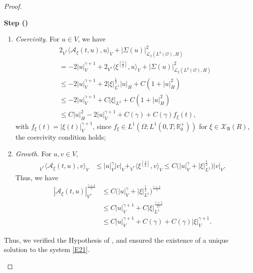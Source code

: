 \documentclass[english,a4paper,11pt]{amsart}
\theoremstyle{plain}
\theoremstyle{definition}
\theoremstyle{remark}
\renewcommand{\emph}[1]{{\sl #1}}
\numberwithin{equation}{section}
\newcounter{lil1}
\newenvironment{step}
{\begin{list} { \bf Step (\Roman{lil1})}
		{ \usecounter{lil1}
			\setlength{\leftmargin}{0.0cm}
			\setlength{\topsep}{0.2cm}
			\setlength{\itemsep}{0.0cm}
			\setlength{\parsep}{0.1cm}
			\setlength{\itemindent}{0.8cm}
			\setlength{\parskip}{0.0cm}}}
	{\end{list}}
\newcounter{lil33}
\newcounter{lil1q}
\newcommand{\MA}{\mathfrak{A}}
\newcommand{\CO}{{{ \mathcal O }}}
\newcommand{\CA}{{{ \mathcal A }}}
\newcommand{\R}{\mathbb{R}}
\renewcommand{\emph}[1]{{\sl #1}}
\begin{document}
\begin{proof}
\begin{step}
\begin{enumerate}
\item \emph{Coercivity}. For $u\in V$, we have 
\begin{align*}
&2	_{V^\ast}\langle \CA_\xi(t,u),u\rangle_{V}+ | \Sigma(u) | _{\mathcal{L}_2(L^2(\CO),H)}^2\\
&\nonumber= -2 | u | _V^{\gamma+1}+2	_{V^\ast}\langle \xi^{[\frac{1}{2}]},u\rangle_V+ | \Sigma(u) | _{\mathcal{L}_2(L^2(\CO),H)}^2
	\\&\nonumber\leq 
	-2 | u | _V^{\gamma+1}+2 | \xi | _{L^1}^\frac{1}{2} | u | _H+C(1+ | u | _{H}^2)
	\\&\nonumber\leq
	-2 | u | _V^{\gamma+1}+C | \xi | _{L^2}+C(1+ | u | _{H}^2)
		\\&\leq
		C | u | _{H}^2-2 | u | _V^{\gamma+1}+C(\gamma)+ C(\gamma)f_\xi(t),
\end{align*}with $f_\xi(t)= | \xi(t) | _{V}^{\gamma+1}$, since $f_\xi\in L^1(\Omega;L^1(0,T;\R^+_0))$ for $\xi\in \mathcal{X}_\MA(R)$, the coercivity condition holds;
\item \emph{Growth}. For $u,v\in V$, 
\begin{align*}
	_{V^\ast}\langle \CA_\xi(t,u),v\rangle_V
	& \leq  | u | _V^\gamma | v | _V +	_{V^\ast}\langle \xi^{[\frac{1}{2}]},v\rangle_V
\leq C\big( | u | _V^\gamma+ | \xi | _{L^1}^\frac{1}{2}\big) | v | _V.
\end{align*}Thus, we have
\begin{align*}
	 | \CA_\xi(t,u) | _{V^\ast}^{\frac{\gamma+1}{\gamma}} &\leq C \big( | u | _V^\gamma+ | \xi | _{L^1}^\frac{1}{2}\big)^\frac{\gamma+1}{\gamma}
	\\&\nonumber\leq C  | u | _V^{\gamma+1}+C  | \xi | _{L^1}^{\frac{\gamma+1}{2\gamma}}
	\\&\leq 
	C | u | _V^{\gamma+1}+C(\gamma)+C(\gamma) | \xi | _V^{\gamma+1}.
\end{align*}
\end{enumerate}
Thus, we verified the Hypothesis of \cite[Theorem 5.1.3]{weiroeckner}, and ensured the existence of a unique solution to the system \eqref{E21}.


\end{step}
\end{proof}
\end{document}
